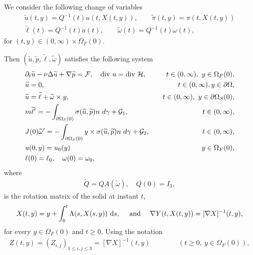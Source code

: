 \documentclass[12pt,a4paper,reqno]{amsart}
\theoremstyle{definition}
\theoremstyle{remark}
\numberwithin{equation}{section}
\newcommand{\oso}{\Omega_{S}(0)}
\newcommand{\ofo}{\Omega_{F}(0)}
\newcommand{\poso}{\partial\oso}
\begin{document}
 We consider the following change of
variables
\begin{gather}
 \widetilde  u (t,y)   = Q^{-1}(t)u(t,X(t,y)), \qquad \widetilde  \pi(t,y)  = \pi(t,X(t,y)) \label{lpq00} \\
\widetilde  \ell(t)   = Q^{-1}(t) \dot a(t), \qquad \widetilde  \omega(t)  = Q^{-1}(t) \omega(t), \label{lpq03}
\end{gather}
for $(t,y) \in (0,\infty) \times \ofo$. %

 Then $(\widetilde u, \widetilde p, \widetilde \ell, \widetilde \omega)$ satisfies the following system
\begin{alignat}{2} \label{eq:NL-1}
&\partial_{t} \widetilde u - \nu \Delta \widetilde u + \nabla \widetilde p  = \mathcal{F}, \quad \mathrm{div} \ u = \mathrm{div} \ \mathcal{H}, &  \quad t \in  (0,\infty), \ y \in \ofo, \notag \\
& \widetilde u = 0,  & t \in (0,\infty),  y \in  \partial\Omega,\notag  \\
&  \widetilde u  = \widetilde \ell  + \widetilde \omega \times y, & \quad t \in   (0,\infty), \ y \in \poso, \notag \\
&  m\widetilde {\ell}' =  -  \int_{\partial \Omega_{S}(0)}  \sigma(\widetilde u,\widetilde p) n \ d\gamma  +  \mathcal{G}_{1}, & \quad t \in (0,\infty), \\
&  J(0) \widetilde\omega '=  - \int_{\partial \Omega_{S}(0)} y \times   \sigma(\widetilde u,\widetilde p)n \ d\gamma + \mathcal{G}_{2}, &  \quad t \in (0,\infty), \notag \\
&  u (0,y) = u_{0}(y) & y \in  \Omega_{F}(0),  \notag \\
&  \ell(0) = \ell_{0},  \quad  \omega(0) = \omega_{0},  \notag
\end{alignat}
where
\begin{align} \label{def-Q-g}
\dot Q  =  Q A(\tilde \omega), \quad Q(0) = I_{3},
\end{align}
is the rotation matrix of the solid at instant $t$,
\begin{align} \label{Jacobi-g}
X(t,y)  = y + \int_{0}^{t} \Lambda(s,X(s,y))  \ {\rm d}s, \quad \mbox{ and } \quad \nabla Y(t,X(t,y)) = [\nabla X]^{-1}(t,y),
\end{align}
for every $y\in \Omega_F(0)$ and $t\geqslant 0$. Using  the notation
\begin{align} \label{Z-g}
Z(t,y) = \left( Z_{i,j}\right)_{1\leqslant i, j\leqslant 3}=[\nabla X]^{-1}(t,y) \qquad\qquad(t\geqslant 0,\ y\in \Omega_F(0)),
\end{align}
\end{document}
